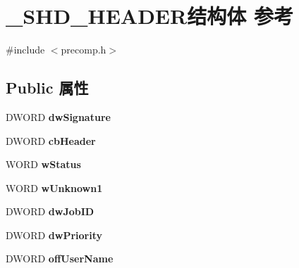 \hypertarget{struct___s_h_d___h_e_a_d_e_r}{}\section{\+\_\+\+S\+H\+D\+\_\+\+H\+E\+A\+D\+E\+R结构体 参考}
\label{struct___s_h_d___h_e_a_d_e_r}


{\ttfamily \#include $<$precomp.\+h$>$}

\subsection*{Public 属性}
\begin{DoxyCompactItemize}
\item 
\mbox{\label{struct___s_h_d___h_e_a_d_e_r_aa931ff049f80854ad268c23554937eb4}} 
D\+W\+O\+RD {\bfseries dw\+Signature}
\item 
\mbox{\label{struct___s_h_d___h_e_a_d_e_r_aa15a2ce05689afd345aa321809b72576}} 
D\+W\+O\+RD {\bfseries cb\+Header}
\item 
\mbox{\label{struct___s_h_d___h_e_a_d_e_r_ac2ac97e77c0e61102a1a914161a19c7d}} 
W\+O\+RD {\bfseries w\+Status}
\item 
\mbox{\label{struct___s_h_d___h_e_a_d_e_r_aeb16faadeaf3673f34c96dfb2c798312}} 
W\+O\+RD {\bfseries w\+Unknown1}
\item 
\mbox{\label{struct___s_h_d___h_e_a_d_e_r_a35f028755610ef774a27539bbb0fc602}} 
D\+W\+O\+RD {\bfseries dw\+Job\+ID}
\item 
\mbox{\label{struct___s_h_d___h_e_a_d_e_r_a6b83e33363f79fe31741d0d86b6bfce3}} 
D\+W\+O\+RD {\bfseries dw\+Priority}
\item 
\mbox{\label{struct___s_h_d___h_e_a_d_e_r_a4320b3e7f641494183e3c6f72ad6ef4c}} 
D\+W\+O\+RD {\bfseries off\+User\+Name}
\item 
\mbox{\label{struct___s_h_d___h_e_a_d_e_r_ae518fe56a65bf3e47bcf765d210375fb}} 

\end{DoxyCompactItemize}
